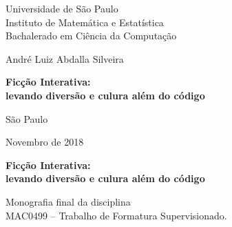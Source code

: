 \documentclass[12pt,twoside,a4paper]{book}
\begin{document}
    \frontmatter
    \fancyhead[RO]{{\footnotesize\rightmark}\hspace{2em}\thepage}
    \setcounter{tocdepth}{2}
    \fancyhead[LE]{\thepage\hspace{2em}\footnotesize{\leftmark}}
    \fancyhead[RE,LO]{}
    \fancyhead[RO]{{\footnotesize\rightmark}\hspace{2em}\thepage}

    \onehalfspacing  %

    \thispagestyle{empty}
    \begin{center}
        \vspace*{2.3cm}
        Universidade de São Paulo\\
        Instituto de Matemática e Estatística\\
        Bachalerado em Ciência da Computação


        \vspace*{3cm}
        \Large{André Luiz Abdalla Silveira}


        \vspace{3cm}
        \textbf{\Large{Ficção Interativa: \\
        levando diversão e culura além do código}}


        \vskip 5cm
        \normalsize{São Paulo}

        \normalsize{Novembro de 2018}
    \end{center}

    \newpage
    \thispagestyle{empty}
    \begin{center}
        \vspace*{2.3 cm}
        \textbf{\Large{Ficção Interativa: \\
        levando diversão e culura além do código}}
        \vspace*{2 cm}
    \end{center}

    \vskip 2cm

    \begin{flushright}
        Monografia final da disciplina \\
        MAC0499 -- Trabalho de Formatura Supervisionado.
    \end{flushright}
\end{document}

